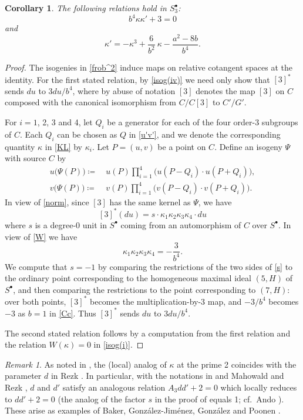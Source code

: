 \documentclass[microtype]{gtpart}     %
\newtheorem{cor}{Corollary}[section]
\theoremstyle{remark}
\newtheorem{rmk}{Remark}[section]
\theoremstyle{definition}
\newcommand{\ce}{\coloneqq}
\newcommand{\K}{\kappa}
\newcommand{\s}{S^\bullet}
\newcommand{\isog}[1]{\fullref{prop:isog}\thinspace \eqref{isog(#1)}}
\begin{document}
\begin{cor}
\label{cor:K'}
 The following relations hold in $\s_3$: 
 \[
  b^4 \K \K' + 3 = 0 
 \]
 and 
 \[
  \K' = -\K^3 + \frac{6}{b^2} ~ \K - \frac{a^2 - 8 b}{b^4}.  
 \]
\end{cor}
\begin{proof}
 The isogenies in \eqref{frob^2} induce maps on relative cotangent spaces at 
 the identity.  For the first stated relation, by \isog{iv} we need only show 
 that $[3]^*$ sends $du$ to $3 du / b^4$, where by abuse of notation $[3]$ 
 denotes the map $[3]$ on $C$ composed with the canonical isomorphism from 
 $C/C[3]$ to $C'/G'$.  

 For $i = 1$, 2, 3 and 4, let $Q_i$ be a generator for each of the four 
 order-3 subgroups of $C$.  Each $Q_i$ can be chosen as $Q$ in \eqref{u'v'}, 
 and we denote the corresponding quantity $\K$ in \eqref{KL} by $\K_i$.  Let 
 $P = (u,v)$ be a point on $C$.  Define an isogeny $\Psi$ with source $C$ by 
 \begin{equation*}
 \begin{split}
  u\big( \Psi(P) \big) \ce & ~ u(P) \prod_{i=1}^4 \big( u(P-Q_i) \cdot u(P+Q_i) \big), \\
  v\big( \Psi(P) \big) \ce & ~ v(P) \prod_{i=1}^4 \big( v(P-Q_i) \cdot v(P+Q_i) \big).  
 \end{split}
 \end{equation*}
 In view of \eqref{norm}, since $[3]$ has the same kernel as $\Psi$, we have 
 \begin{equation}
 \label{s}
  [3]^* (du) = s \cdot \K_1 \K_2 \K_3 \K_4 \cdot du 
 \end{equation}
 where $s$ is a degree-0 unit in $\s$ coming from an automorphism of $C$ over 
 $\s$.  In view of \eqref{W} we have 
 \[
  \K_1 \K_2 \K_3 \K_4 = -\frac{3}{b^4}.  
 \]
 We compute that $s = -1$ by comparing the restrictions of the two sides of 
 \eqref{s} to the ordinary point corresponding to the homogeneous maximal 
 ideal $(5,H)$ of $\s$, and then comparing the restrictions to the point 
 corresponding to $(7,H)$: over both points, $[3]^*$ becomes the 
 multiplication-by-3 map, and $-3 / b^4$ becomes $-3$ as $b = 1$ in 
 \eqref{Cc}.  Thus $[3]^*$ sends $du$ to $3 du / b^4$.  

 The second stated relation follows by a computation from the first relation 
 and the relation $W(\K) = 0$ in \isog{i}.  
\end{proof}

\begin{rmk}
\label{rmk:KK'}
 As noted in , the (local) analog of $\K$ at the prime 2 
 coincides with the parameter $d$ in Rezk \cite[Section 3]{h2p2}.  In 
 particular, with the notations in \cite[Section 3]{h2p2} and Mahowald and 
 Rezk \cite[Proposition 3.2]{tmf3}, $d$ and $d'$ satisfy an analogous 
 relation $A_3 d d' + 2 = 0$ which locally reduces to $d d' + 2 = 0$ (the 
 analog of the factor $s$ in the proof of  equals 1; 
 cf.~Ando \cite[Theorem 2.6.4]{andoduke}).  These arise as examples of Baker, 
 Gonz{\'a}lez-Jim{\'e}nez, Gonz{\'a}lez and Poonen \cite[Lemma 3.21]{poonen}.  
\end{rmk}
\end{document}
